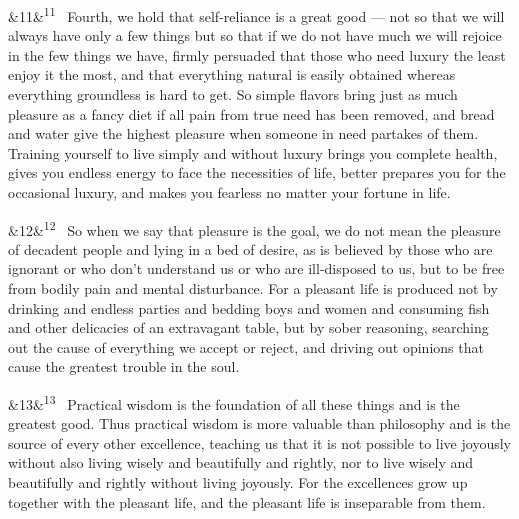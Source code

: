 \documentclass[12pt]{article}
\newcommand{\para}[1][]{\par\noindent\ifx&#1&\else\textsuperscript{\footnotesize #1}~\fi}
\begin{document}
\para[11] Fourth, we hold that self-reliance is a great good --- not so that we will always have only a few things but so that if we do not have much we will rejoice in the few things we have, firmly persuaded that those who need luxury the least enjoy it the most, and that everything natural is easily obtained whereas everything groundless is hard to get. So simple flavors bring just as much pleasure as a fancy diet if all pain from true need has been removed, and bread and water give the highest pleasure when someone in need partakes of them. Training yourself to live simply and without luxury brings you complete health, gives you endless energy to face the necessities of life, better prepares you for the occasional luxury, and makes you fearless no matter your fortune in life.

\para[12] So when we say that pleasure is the goal, we do not mean the pleasure of decadent people and lying in a bed of desire, as is believed by those who are ignorant or who don't understand us or who are ill-disposed to us, but to be free from bodily pain and mental disturbance. For a pleasant life is produced not by drinking and endless parties and bedding boys and women and consuming fish and other delicacies of an extravagant table, but by sober reasoning, searching out the cause of everything we accept or reject, and driving out opinions that cause the greatest trouble in the soul.

\para[13] Practical wisdom is the foundation of all these things and is the greatest good. Thus practical wisdom is more valuable than philosophy and is the source of every other excellence, teaching us that it is not possible to live joyously without also living wisely and beautifully and rightly, nor to live wisely and beautifully and rightly without living joyously. For the excellences grow up together with the pleasant life, and the pleasant life is inseparable from them.
\end{document}
